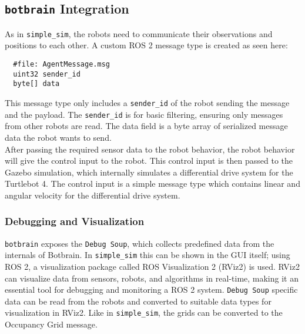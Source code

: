 \subsection{\texttt{botbrain} Integration}\label{sub:Botbrain_integration}
As in \texttt{simple\_sim}, the robots need to communicate their observations and positions to each other. A custom ROS 2 message type is created as seen here:
\begin{verbatim}
  #file: AgentMessage.msg
  uint32 sender_id
  byte[] data
\end{verbatim}

This message type only includes a \texttt{sender\_id} of the robot sending the message and the payload. The \texttt{sender\_id} is for basic filtering, ensuring only messages from other robots are read.
The data field is a byte array of serialized message data the robot wants to send. \\

After passing the required sensor data to the robot behavior, the robot behavior will give the control input to the robot. This control input is then passed to the Gazebo simulation, which internally simulates a differential drive system for the Turtlebot 4. The control input is a simple message type which contains linear and angular velocity for the differential drive system. \\

\subsubsection{Debugging and Visualization}\label{sec:debugging_rviz}
\texttt{botbrain} exposes the \texttt{Debug Soup}, which collects predefined data from the internals of Botbrain.
In \texttt{simple\_sim} this can be shown in the GUI itself; using ROS 2, a visualization package called ROS Visualization 2 (RViz2) is used.
RViz2 can visualize data from sensors, robots, and algorithms in real-time, making it an essential tool for debugging and monitoring a ROS 2 system.
\texttt{Debug Soup} specific data can be read from the robots and converted to suitable data types for visualization in RViz2. Like in \texttt{simple\_sim}, the grids can be converted to the Occupancy Grid message.
